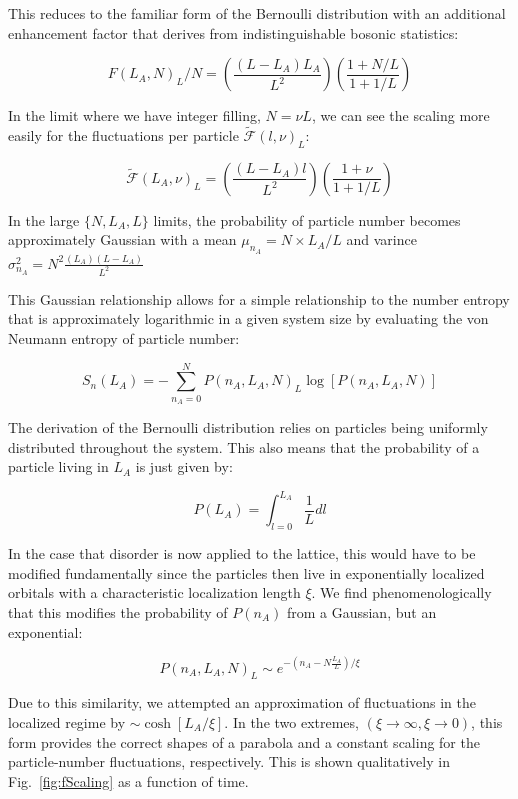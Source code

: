 This reduces to the familiar form of the Bernoulli distribution with an additional enhancement factor that derives from indistinguishable bosonic statistics:

\begin{equation}
\label{eqn:FNL}
F(L_A,N)_L/N = \left ( \frac{\left ( L-L_A \right ) L_A }{L^2} \right ) \left ( \frac{ 1+N/L }{ 1+1/L } \right )
\end{equation}

In the limit where we have integer filling, $N=\nu L$, we can see the scaling more easily for the fluctuations per particle $\tilde{\mathcal{F}}(l,\nu)_L$:

\begin{equation}
\label{eqn:FNL2}
\tilde{\mathcal{F}}(L_A,\nu)_L = \left ( \frac{\left ( L-L_A \right ) l }{L^2} \right ) \left ( \frac{ 1+\nu }{ 1+1/L } \right )
\end{equation}

In the large $\{N,L_A,L\}$ limits, the probability of particle number becomes approximately Gaussian with a mean $\mu_{n_A} = N \times L_A/L$ and varince $\sigma_{n_A}^2 = N^2 \frac{(L_A)(L-L_A)}{L^2}$

This Gaussian relationship allows for a simple relationship to the number entropy that is approximately logarithmic in a given system size by evaluating the von Neumann entropy of particle number:

\begin{equation}
S_n (L_A) = - \sum_{n_A=0}^N P(n_A,L_A, N)_L \log [P(n_A,L_A, N)]
\end{equation}

The derivation of the Bernoulli distribution relies on particles being uniformly distributed throughout the system. This also means that the probability of a particle living in $L_A$ is just given by:

\[
P(L_A)=\int_{l=0}^{L_A} \frac{1}{L} d{l}
\] 

In the case that disorder is now applied to the lattice, this would have to be modified fundamentally since the particles then live in exponentially localized orbitals with a characteristic localization length $\xi$.  We find phenomenologically that this modifies the probability of $P(n_A)$ from a Gaussian, but an exponential:

\[
P(n_A,L_A,N)_L \sim e^{-(n_A-N \frac{L_A}{L})/\xi}
\]

Due to this similarity, we attempted an approximation of fluctuations in the localized regime by $\sim \cosh[L_A/\xi]$. In the two extremes, $(\xi\rightarrow \infty, \xi\rightarrow 0)$, this form provides the correct shapes of a parabola and a constant scaling for the particle-number fluctuations, respectively. This is shown qualitatively in Fig.~\ref{fig:fScaling} as a function of time.

